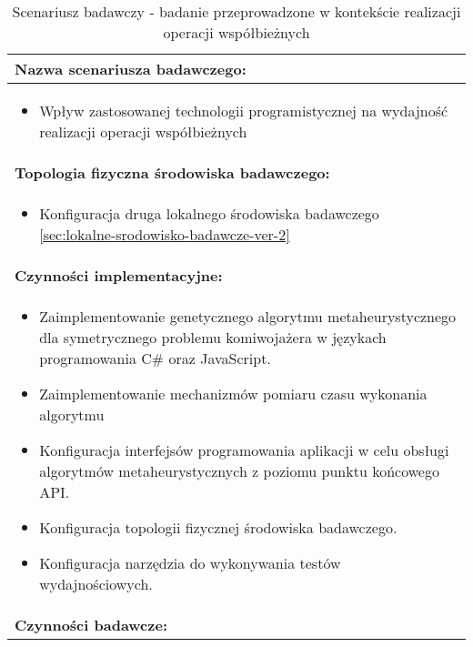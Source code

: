 \setlength{\LTcapwidth}{\textwidth}
\setlength\LTleft{0pt}
\setlength\LTright{0pt}
\begin{longtable}[c]{|llll|}
    \caption{Scenariusz badawczy - badanie przeprowadzone w kontekście realizacji operacji współbieżnych}
    \label{tab:research-scenario-2}                                                  \\ \hline
    \multicolumn{4}{|l|}{\textbf{Nazwa scenariusza badawczego:}}                     \\ \hline
    \multicolumn{4}{|p{\linewidth}|}{
        \begin{itemize}[label={}]
            \item Wpływ zastosowanej technologii programistycznej na wydajność realizacji operacji współbieżnych
          \end{itemize}
    } \\ \hline
    \multicolumn{4}{|l|}{\textbf{Topologia fizyczna środowiska badawczego:}}         \\ \hline
    \multicolumn{4}{|p{\linewidth}|}{
        \begin{itemize}[label={}]
            \item Konfiguracja druga lokalnego środowiska badawczego \ref{sec:lokalne-srodowisko-badawcze-ver-2}
          \end{itemize}
    }\\ \hline
    \multicolumn{4}{|l|}{\textbf{Czynności implementacyjne:}}                        \\ \hline
    \multicolumn{4}{|p{\linewidth}|}{
        \begin{itemize}
            \item Zaimplementowanie genetycznego algorytmu metaheurystycznego dla symetrycznego problemu komiwojażera w językach programowania C\# oraz JavaScript.
            \item Zaimplementowanie mechanizmów pomiaru czasu wykonania algorytmu
            \item Konfiguracja interfejsów programowania aplikacji w celu obsługi algorytmów metaheurystycznych z poziomu punktu końcowego API.
            \item Konfiguracja topologii fizycznej środowiska badawczego.
            \item Konfiguracja narzędzia do wykonywania testów wydajnościowych.
        \end{itemize}}                                                           \\ \hline
    \multicolumn{4}{|l|}{\textbf{Czynności badawcze:}}                               \\ \hline

\end{longtable}
